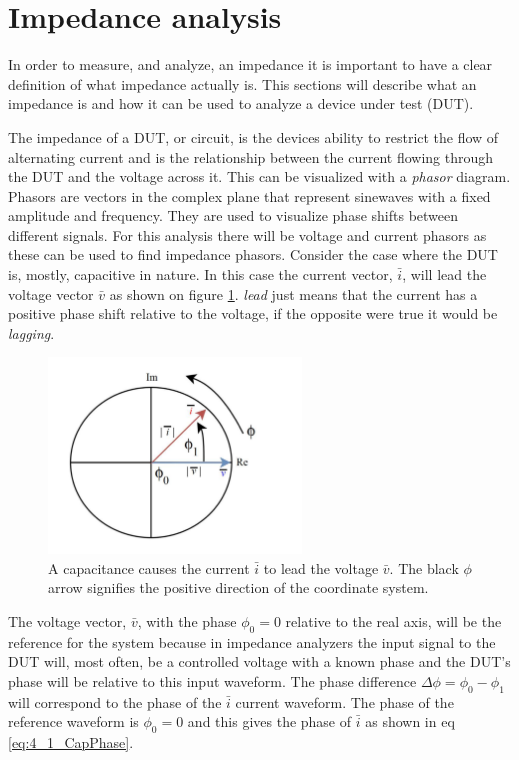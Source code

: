 \section{Impedance analysis} \label{sec:ImpedanceAnalysis}
In order to measure, and analyze, an impedance it is important to have a clear definition of what impedance actually is. This sections will describe what an impedance is and how it can be used to analyze a device under test (DUT).

The impedance of a DUT, or circuit, is the devices ability to restrict the flow of alternating current and is the relationship between the current flowing through the DUT and the voltage across it. This can be visualized with a \textit{phasor} diagram. Phasors are vectors in the complex plane that represent sinewaves with a fixed amplitude and frequency. They are used to visualize phase shifts between different signals. For this analysis there will be voltage and current phasors as these can be used to find impedance phasors. Consider the case where the DUT is, mostly, capacitive in nature. In this case the current vector, $\bar i$, will lead the voltage vector $\bar v$ as shown on figure \ref{fig:4_1_CapPhasor}. \textit{lead} just means that the current has a positive phase shift relative to the voltage, if the opposite were true it would be \textit{lagging}.

\begin{figure}[H]
    \centering
    \includegraphics[clip, trim=0 0 0 0, width=0.60\textwidth]{Sections/4_TechnicalAnalysis/Figures/4_1_CapacitancePhasor.pdf}
    \caption{A capacitance causes the current $\bar i$ to lead the voltage $\bar v$. The black $\phi$ arrow signifies the positive direction of the coordinate system.}
    \label{fig:4_1_CapPhasor}
\end{figure}

The voltage vector, $\bar v$, with the phase $\phi_0 = 0$ relative to the real axis, will be the reference for the system because in impedance analyzers the input signal to the DUT will, most often, be a controlled voltage with a known phase and the DUT's phase will be relative to this input waveform. The phase difference $\Delta \phi = \phi_0 - \phi_1$ will correspond to the phase of the $\bar i$ current waveform. The phase of the reference waveform is $\phi_0 = 0$ and this gives the phase of $\bar i$ as shown in eq \ref{eq:4_1_CapPhase}.


